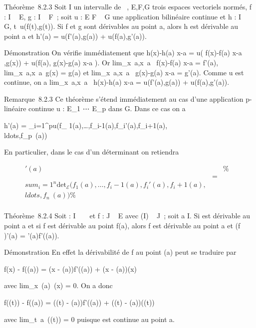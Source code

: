 Théorème~8.2.3 Soit I un intervalle de ~, E,F,G trois espaces vectoriels
normés, f : I \rightarrow~ E, g : I \rightarrow~ F~; soit u : E \times F \rightarrow~ G une application
bilinéaire continue et h : I \rightarrow~ G,
t\mapsto~u(f(t),g(t)). Si f et g sont dérivables au
point a, alors h est dérivable au point a et h'(a) = u(f'(a),g(a)) +
u(f(a),g'(a)).

Démonstration On vérifie immédiatement que  h(x)-h(a)
\over x-a = u( f(x)-f(a) \over x-a
,g(x)) + u(f(a), g(x)-g(a) \over x-a ). Or
lim_x\rightarrow~a,x\neq~a~
f(x)-f(a) \over x-a = f'(a),
lim_x\rightarrow~a,x\neq~a~g(x)
= g(a) et
lim_x\rightarrow~a,x\neq~a~
g(x)-g(a) \over x-a = g'(a). Comme u est continue, on a
lim_x\rightarrow~a,x\neq~a~
h(x)-h(a) \over x-a = u(f'(a),g(a)) + u(f(a),g'(a)).

Remarque~8.2.3 Ce théorème s'étend immédiatement au cas d'une
application p-linéaire continue u : E_1
\times⋯ \times E_p dans G. Dans ce cas on a

h'(a) = \sum _i=1^pu(f_
1(a),\ldots,f_i-1(a),f_i'(a),f_i+1(a),\\ldots,f_p~(a))

En particulier, dans le cas d'un déterminant on retiendra

\begin{align*}
[\mathrm{det}~
_\mathcal{E}(f_1,\\ldots,f_n~)]'(a)&&
\%& \\ & =& \\sum
_i=1^n \mathrm{det} _
\mathcal{E}(f_1(a),\ldots,f_i-1(a),f_i'(a),f_i+1(a),\\ldots,f_n~(a))\%&
\\ \end{align*}

Théorème~8.2.4 Soit \phi : I \rightarrow~ ~ et f : J \rightarrow~ E avec \phi(I) \subset~ J~; soit a \in I.
Si \phi est dérivable au point a et si f est dérivable au point f(a), alors
f \cdot \phi est dérivable au point a et (f \cdot \phi)'(a) = \phi'(a)f'(\phi(a)).

Démonstration En effet la dérivabilité de f au point \phi(a) peut se
traduire par

f(x) - f(\phi(a)) = (x - \phi(a))f'(\phi(a)) + (x - \phi(a))\epsilon(x)

avec lim_x\rightarrow~\phi(a)~\epsilon(x) = 0. On a donc

f(\phi(t)) - f(\phi(a)) = (\phi(t) - \phi(a))f'(\phi(a)) + (\phi(t) - \phi(a))\epsilon(\phi(t))

avec lim_t\rightarrow~a~\epsilon(\phi(t)) = 0 puisque \phi est
continue au point a.

